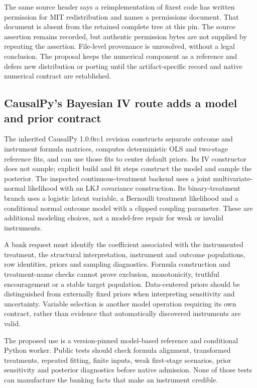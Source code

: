 The same source header says a reimplementation of fixest code has written
permission for MIT redistribution and names a permissions document. That
document is absent from the retained complete tree at this pin. The source
assertion remains recorded, but authentic permission bytes are not supplied
by repeating the assertion. File-level provenance is unresolved, without
a legal conclusion. The proposal keeps the numerical component as a
reference and defers new distribution or porting until the artifact-specific
record and native numerical contract are established.
\citep{exec25_pyrdiv_pyfixest,exec25_pyrdiv_choice}

\subsection{CausalPy's Bayesian IV route adds a model and prior contract}
The inherited CausalPy 1.0.0rc1 revision constructs separate outcome and
instrument formula matrices, computes deterministic OLS and two-stage
reference fits, and can use those fits to center default priors. Its IV
constructor does not sample; explicit build and fit steps construct the
model and sample the posterior. The inspected continuous-treatment backend
uses a joint multivariate-normal likelihood with an LKJ covariance
construction. Its binary-treatment branch uses a logistic latent variable,
a Bernoulli treatment likelihood and a conditional normal outcome model
with a clipped coupling parameter. These are additional modeling choices,
not a model-free repair for weak or invalid instruments.
\citep{exec25_pyrdiv_causalpy}

A bank request must identify the coefficient associated with the
instrumented treatment, the structural interpretation, instrument and
outcome populations, row identities, priors and sampling diagnostics.
Formula construction and treatment-name checks cannot prove exclusion,
monotonicity, truthful encouragement or a stable target population.
Data-centered priors should be distinguished from externally fixed priors
when interpreting sensitivity and uncertainty. Variable selection is
another model operation requiring its own contract, rather than evidence
that automatically discovered instruments are valid.
\citep{exec25_pyrdiv_causalpy,exec25_pyrdiv_choice}

The proposed use is a version-pinned model-based reference and conditional
Python worker. Public tests should check formula alignment, transformed
treatments, repeated fitting, finite inputs, weak first-stage scenarios,
prior sensitivity and posterior diagnostics before native admission.
None of those tests can manufacture the banking facts that make an
instrument credible.\citep{exec25_pyrdiv_choice}

